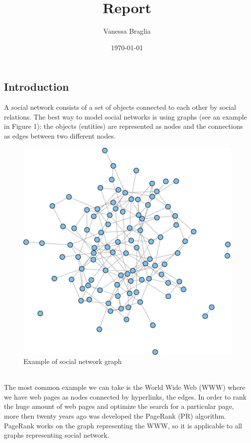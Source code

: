 \documentclass[12 pt]{article}
\author{Vanessa Braglia}
\title{Report}
\date{\today}
\begin{document}
\maketitle 
\newpage
\subsection*{Introduction}
A social network consists of a set of objects connected to each other by social relations. The best way to model social networks is using graphs (see an example in Figure 1): the objects (entities) are represented as nodes and the connections as edges between two different nodes. \\
\begin{figure} [h!]
\centering 
\includegraphics[scale=0.5]{graph.png}
\caption{Example of social network graph}
\end{figure}
\\
The most common example we can take is the World Wide Web (WWW) where we have web pages as nodes connected by hyperlinks, the edges. In order to rank the huge amount of web pages and optimize the search for a particular page, more then twenty years ago was developed the PageRank (PR) algorithm. PageRank works on the graph representing the WWW, so it is applicable to all graphs representing social network.
\end{document}

